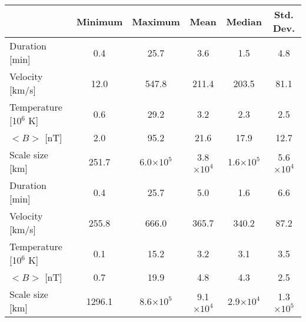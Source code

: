 \begin{tabular}{lccccc}
\hline
                       & Minimum & Maximum & Mean & Median & Std. Dev. \\
\hline
Duration [min]         &     0.4 &      25.7 &      3.6 &     1.5 &       4.8 \\
Velocity [km/s]        &    12.0 &     547.8 &    211.4 &   203.5 &      81.1 \\
Temperature [10$^6$ K] &     0.6 &      29.2 &      3.2 &     2.3 &       2.5 \\
$<B>$ [nT]             &     2.0 &      95.2 &     21.6 &    17.9 &      12.7 \\
Scale size [km]        &   251.7 & 6.0$\times 10^5$ & 3.8$\times 10^4$ & 1.6$\times 10^5$ &   5.6$\times 10^4$ \\

\hline \hline

Duration [min]          &     0.4 &      25.7 &      5.0 &     1.6 &       6.6 \\
Velocity [km/s]         &   255.8 &     666.0 &    365.7 &   340.2 &      87.2 \\
Temperature [10$^6$ K]  &     0.1 &      15.2 &      3.2 &     3.1 &       3.5 \\
$<B>$ [nT]              &     0.7 &      19.9 &      4.8 &     4.3 &       2.5 \\
Scale size [km]         &  1296.1 & 8.6$\times 10^5$ & 9.1$\times 10^4$ & 2.9$\times 10^4$ &  1.3$\times 10^5$ \\
\hline
\end{tabular}